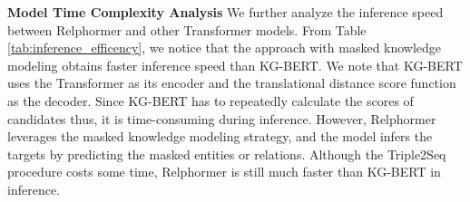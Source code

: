 \documentclass[sigconf]{acmart}
\begin{document}
 
\begin{table}[!t]

    \caption{\textbf{Inference efficiency comparison.} 
    $ \left | \mathcal{E} \right |$, $ \left | \mathcal{R} \right |$ and $ \left | \mathcal{G} \right |$ are numbers of  entities, relations, inference samples in the graph respectively.
    $k$ is the length of input sequence.
    The time refers to the speed of inference time given a single (entity, relation) on FB15K-237.
    } 

    \centering
   
     \label{tab:inference_efficency}


\end{table} 





\textbf{Model Time Complexity Analysis}
\label{sec:time}
We further analyze the inference speed between Relphormer and other Transformer models.
From Table \ref{tab:inference_efficency}, we notice that the approach with masked knowledge modeling obtains faster inference speed than KG-BERT.
We note that KG-BERT uses the Transformer as its encoder and the translational distance score function as the decoder.
Since KG-BERT has to repeatedly calculate the scores of candidates thus, it is time-consuming during inference.
However, Relphormer leverages the masked knowledge modeling strategy, and the model infers the targets by predicting the masked entities or relations. 
Although the Triple2Seq procedure costs some time, Relphormer is still much faster than KG-BERT in inference.
\end{document}
